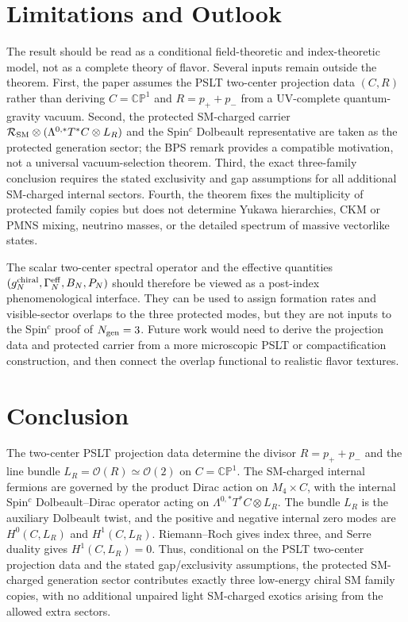 \documentclass[aps,prd,preprint,notitlepage,nofootinbib,superscriptaddress,floatfix]{revtex4-2}
\newcommand{\cO}{\mathcal O}
\newcommand{\cR}{\mathcal R}
\newcommand{\CP}{\mathbb{CP}}
\theoremstyle{remark}
\begin{document}
\section{Limitations and Outlook}
\label{sec:limitations_outlook}

The result should be read as a conditional field-theoretic and index-theoretic model, not as a complete theory of flavor.
Several inputs remain outside the theorem.
First, the paper assumes the PSLT two-center projection data \((C,R)\) rather than deriving \(C=\CP^1\) and \(R=p_+ + p_-\) from a UV-complete quantum-gravity vacuum.
Second, the protected SM-charged carrier \(\cR_{\rm SM}\otimes(\Lambda^{0,*}T^*C\otimes L_R)\) and the Spin\(^c\) Dolbeault representative are taken as the protected generation sector; the BPS remark provides a compatible motivation, not a universal vacuum-selection theorem.
Third, the exact three-family conclusion requires the stated exclusivity and gap assumptions for all additional SM-charged internal sectors.
Fourth, the theorem fixes the multiplicity of protected family copies but does not determine Yukawa hierarchies, CKM or PMNS mixing, neutrino masses, or the detailed spectrum of massive vectorlike states.

The scalar two-center spectral operator and the effective quantities \((g_N^{\rm chiral},\Gamma_N^{\rm eff},B_N,P_N)\) should therefore be viewed as a post-index phenomenological interface.
They can be used to assign formation rates and visible-sector overlaps to the three protected modes, but they are not inputs to the Spin\(^c\) proof of \(N_{\rm gen}=3\).
Future work would need to derive the projection data and protected carrier from a more microscopic PSLT or compactification construction, and then connect the overlap functional to realistic flavor textures.

\section{Conclusion}
\label{sec:conclusion}

The two-center PSLT projection data determine the divisor \(R=p_+ + p_-\) and the line bundle \(L_R=\cO(R)\simeq\cO(2)\) on \(C=\CP^1\).
The SM-charged internal fermions are governed by the product Dirac action on \(M_4\times C\), with the internal Spin\(^c\) Dolbeault--Dirac operator acting on \(\Lambda^{0,*}T^*C\otimes L_R\).
The bundle \(L_R\) is the auxiliary Dolbeault twist, and the positive and negative internal zero modes are \(H^0(C,L_R)\) and \(H^1(C,L_R)\).
Riemann--Roch gives index three, and Serre duality gives \(H^1(C,L_R)=0\).
Thus, conditional on the PSLT two-center projection data and the stated gap/exclusivity assumptions, the protected SM-charged generation sector contributes exactly three low-energy chiral SM family copies, with no additional unpaired light SM-charged exotics arising from the allowed extra sectors.
\end{document}

